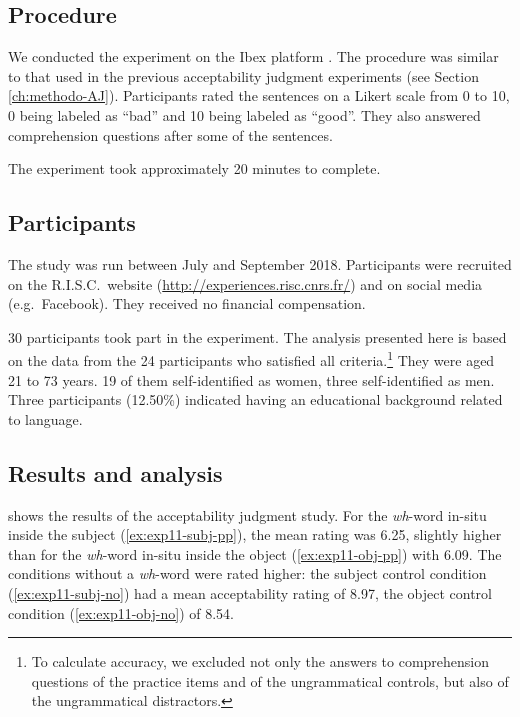 \subsection{Procedure} 

We conducted the experiment on the Ibex platform \citep{Ibex}. The procedure was similar to that used in the previous acceptability judgment experiments (see Section \ref{ch:methodo-AJ}). Participants rated the sentences on a Likert scale from 0 to 10, 0 being labeled as ``bad'' and 10 being labeled as ``good''. They also answered comprehension questions after some of the sentences.

The experiment took approximately 20 minutes to complete. 

\subsection{Participants}

The study was run between July and September 2018. 
Participants were recruited on the R.I.S.C.\ website (\url{http://experiences.risc.cnrs.fr/}) and on social media (e.g.\ Facebook).
They received no financial compensation. 

30 participants took part in the experiment. 
The analysis presented here is based on the data from the 24 participants who satisfied all criteria.\footnote{To calculate accuracy, we excluded not only the answers to comprehension questions of the practice items and of the ungrammatical controls, but also of the ungrammatical distractors.}
They were aged 21 to 73 years. 19 of them self-identified as women, three self-identified as men. Three participants (12.50\%) indicated having an educational background related to language.

\subsection{Results and analysis}

 shows the results of the acceptability judgment study.
For the \emph{wh}-word in-situ inside the subject (\ref{ex:exp11-subj-pp}), the mean rating was 6.25, slightly higher than for the \emph{wh}-word in-situ inside the object (\ref{ex:exp11-obj-pp}) with 6.09. The conditions without a \emph{wh}-word were rated higher: the subject control condition (\ref{ex:exp11-subj-no}) had a mean acceptability rating of 8.97, the object control condition (\ref{ex:exp11-obj-no}) of 8.54. 

